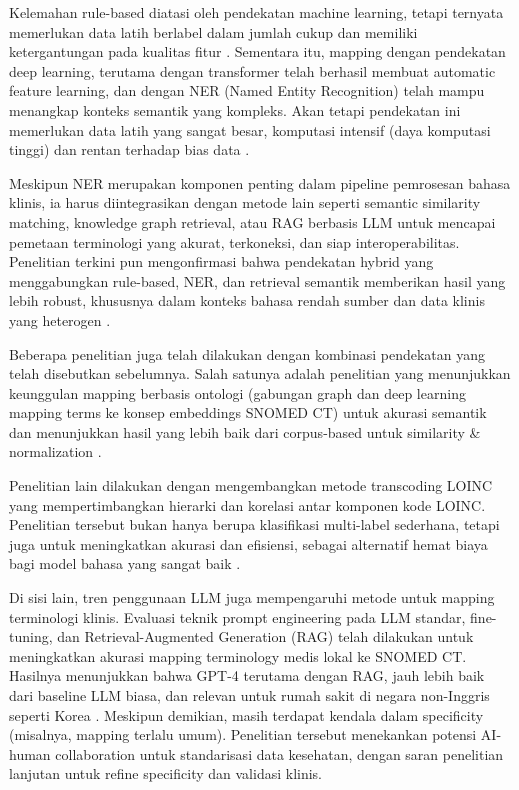 Kelemahan rule-based diatasi oleh pendekatan machine learning, tetapi ternyata memerlukan data latih berlabel dalam jumlah cukup dan memiliki ketergantungan pada kualitas fitur \citep{agrawal_evaluating_2018,januel_improved_2011}. Sementara itu, mapping dengan pendekatan deep learning, terutama dengan transformer telah berhasil membuat automatic feature learning, dan dengan NER (Named Entity Recognition) telah mampu menangkap konteks semantik yang kompleks. Akan tetapi pendekatan ini memerlukan data latih yang sangat besar, komputasi intensif (daya komputasi tinggi) dan rentan terhadap bias data \citep{hristov_application_2021,soriano_snomed2vec_2019,zhou_novel_2024}.

Meskipun NER merupakan komponen penting dalam pipeline pemrosesan bahasa klinis, ia harus diintegrasikan dengan metode lain seperti semantic similarity matching, knowledge graph retrieval, atau RAG berbasis LLM untuk mencapai pemetaan terminologi yang akurat, terkoneksi, dan siap interoperabilitas. Penelitian terkini pun mengonfirmasi bahwa pendekatan hybrid yang menggabungkan rule-based, NER, dan retrieval semantik memberikan hasil yang lebih robust, khususnya dalam konteks bahasa rendah sumber dan data klinis yang heterogen \citep{chen_clinical_2020,gilani_cde-mapper_2025,pezoulas_hybrid_2021}.

Beberapa penelitian juga telah dilakukan dengan kombinasi pendekatan yang telah disebutkan sebelumnya. Salah satunya adalah penelitian yang menunjukkan keunggulan mapping berbasis ontologi (gabungan graph dan deep learning mapping terms ke konsep embeddings SNOMED CT) untuk akurasi semantik dan menunjukkan hasil yang lebih baik dari corpus-based untuk similarity \& normalization \citep{zahra_obtaining_2024}.

Penelitian lain dilakukan dengan mengembangkan metode transcoding LOINC yang mempertimbangkan hierarki dan korelasi antar komponen kode LOINC. Penelitian tersebut bukan hanya berupa klasifikasi multi-label sederhana, tetapi juga untuk meningkatkan akurasi dan efisiensi, sebagai alternatif hemat biaya bagi model bahasa yang sangat baik \citep{michel-picque_classifier_2024}.

Di sisi lain, tren penggunaan LLM juga mempengaruhi metode untuk mapping terminologi klinis. Evaluasi teknik prompt engineering pada LLM standar, fine-tuning, dan Retrieval-Augmented Generation (RAG) telah dilakukan untuk meningkatkan akurasi mapping terminology medis lokal ke SNOMED CT. Hasilnya menunjukkan bahwa GPT-4 terutama dengan RAG, jauh lebih baik dari baseline LLM biasa, dan relevan untuk rumah sakit di negara non-Inggris seperti Korea \citep{huh_comparative_2025}. Meskipun demikian, masih terdapat kendala dalam specificity (misalnya, mapping terlalu umum). Penelitian tersebut menekankan potensi AI-human collaboration untuk standarisasi data kesehatan, dengan saran penelitian lanjutan untuk refine specificity dan validasi klinis.

